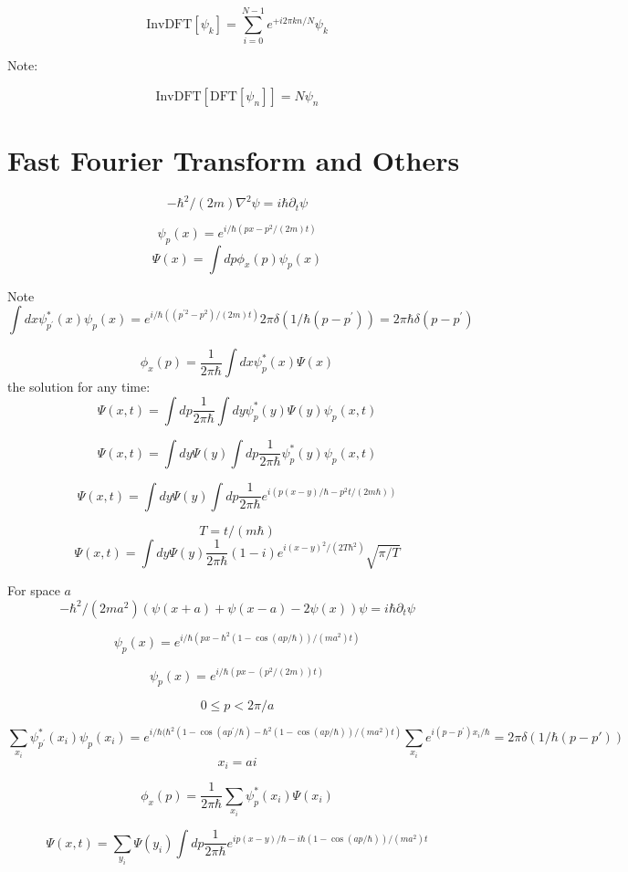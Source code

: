 \documentclass[12pt,twoside]{article}
\begin{document}
$$
\text{InvDFT}[\psi_k] = \sum_{i=0}^{N-1} e^{+i2\pi k n/N} \psi_k
$$

Note:

$$
\text{InvDFT}[\text{DFT}[\psi_n]] = N\psi_n
$$


\section{Fast Fourier Transform and Others}

$$
-\hbar^2/(2m) \nabla^2 \psi = i \hbar \partial_t \psi
$$

$$
\psi_p(x) = e^{ i/\hbar (p x - p^2 /(2m)t)}
$$
$$
\Psi(x) = \int dp \phi_x(p) \psi_p(x)
$$

Note
$$
\int dx \psi_{p^\prime}^*(x) \psi_{p}(x) = e^{ i/\hbar ((p^{\prime2} - p^2) /(2m)t)} 2\pi\delta(1/\hbar(p-p^\prime))
=2\pi\hbar\delta(p-p^\prime)
$$

$$
\phi_x(p) = \frac{1}{2\pi\hbar}\int dx \psi^*_p(x) \Psi(x)
$$
the solution for any time:
$$
\Psi(x, t) = \int dp \frac{1}{2\pi\hbar}\int dy \psi^*_p(y) \Psi(y) \psi_p(x,t)
$$

$$
\Psi(x, t) = \int dy  \Psi(y) \int dp \frac{1}{2\pi\hbar}\psi^*_p(y) \psi_p(x,t)
$$

$$
\Psi(x, t) = \int dy  \Psi(y) \int dp \frac{1}{2\pi\hbar} e^{i(p(x-y)/\hbar - p^2 t/(2m\hbar))}
$$

$$
T=t/(m\hbar)
$$
$$
\Psi(x, t) = \int dy  \Psi(y) \frac{1}{2\pi\hbar} (1-i) e^{i (x-y)^2 / (2 T \hbar^2)}  \sqrt{\pi / T}
$$


For space $a$
$$
-\hbar^2/(2m a^2) (\psi(x+a) + \psi(x-a) - 2\psi(x)) \psi = i \hbar \partial_t \psi
$$

$$
\psi_p(x) = e^{ i/\hbar (p x - \hbar^2(1 - \cos(a p/\hbar))/(m a^2)t)}
$$

$$
\psi_p(x) = e^{ i/\hbar (p x - (p^2/(2m))t)}
$$

$$
0 \le p < 2\pi / a
$$

$$
\sum_{x_i} \psi_{p^\prime}^*(x_i) \psi_{p}(x_i) = e^{ i/\hbar (\hbar^2(1 - \cos(a p^\prime/\hbar) - \hbar^2(1 - \cos(a p/\hbar))/(m a^2)t)}
\sum_{x_i}e^{i(p-p^\prime)x_i/\hbar} = 2\pi\delta(1/\hbar(p - p\prime))
$$
$$
x_i = ai
$$

$$
\phi_x(p) = \frac{1}{2\pi\hbar}\sum_{x_i} \psi^*_p(x_i) \Psi(x_i)
$$

$$
\Psi(x, t) = \sum_{y_i} \Psi(y_i) \int dp \frac{1}{2\pi\hbar} e^{ ip(x-y)/\hbar - i\hbar(1 - \cos(a p/\hbar))/(m a^2)t}
$$
\end{document}
